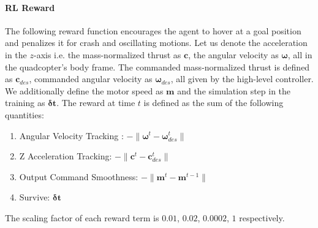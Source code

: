 \paragraph{RL Reward} The following reward function encourages the agent to hover at a goal position and penalizes it for crash and oscillating motions. Let us denote the acceleration in the $z$-axis i.e. the mass-normalized thrust as $\mathbf{c}$, the angular velocity as $\bm{\omega}$, all in the quadcopter's body frame. The commanded mass-normalized thrust is defined as $\bm{c}_{des}$, commanded angular velocity as $\bm{\omega}_{des}$, all given by the high-level controller.
We additionally define the motor speed as $\bm{m}$ and the simulation step in the training as $\bm{\delta t}$. The reward at time $t$ is defined as the sum of the following quantities:
\begin{enumerate}
    \item Angular Velocity Tracking : $-\| \bm{\omega}^{t} - \bm{\omega}_{des}^{t} \|$
    \item Z Acceleration Tracking: $-\| \mathbf{c}^{t} - \mathbf{c}_{des}^{t} \|$
    \item Output Command Smoothness: $-\| \bm{m}^{t} - \bm{m}^{t-1} \|$
    \item Survive: $\bm{\delta t}$
\end{enumerate}
The scaling factor of each reward term is $0.01$, $0.02$, $0.0002$, $1$ respectively. 

